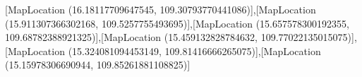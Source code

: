 [MapLocation (16.18117709647545, 109.30793770441086)],[MapLocation (15.911307366302168, 109.5257755493695)],[MapLocation (15.657578300192355, 109.68782388921325)],[MapLocation (15.459132828784632, 109.77022135015075)],[MapLocation (15.324081094453149, 109.81416666265075)],[MapLocation (15.15978306690944, 109.85261881108825)]